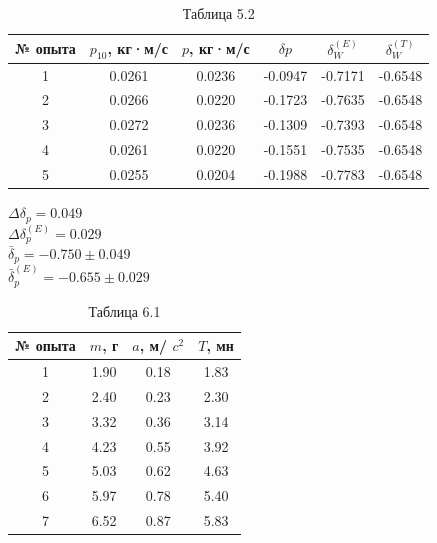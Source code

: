 \documentclass[12pt]{article}
\begin{document}
\begin{flushleft}
    
    \begin{table}[h]
        \centering
        \renewcommand{\arraystretch}{1.3}
        \setlength{\tabcolsep}{8pt}
        \captionsetup{justification=centering, font=bf}
        \caption{Таблица 5.2}
        \begin{tabular}{|c|c|c|c|c|c|}
            \hline
            № опыта & \( p_{10} \), кг·м/с & \( p \), кг·м/с & \( \delta p \) & \( \delta_W^{(E)} \) & \( \delta_W^{(T)} \) \\
            \hline
            1 & 0.0261 & 0.0236 & -0.0947 & -0.7171 & -0.6548 \\
            \hline
            2 & 0.0266 & 0.0220 & -0.1723 & -0.7635 & -0.6548 \\
            \hline
            3 & 0.0272 & 0.0236 & -0.1309 & -0.7393 & -0.6548 \\
            \hline
            4 & 0.0261 & 0.0220 & -0.1551 & -0.7535 & -0.6548 \\
            \hline
            5 & 0.0255 & 0.0204 & -0.1988 & -0.7783 & -0.6548 \\
            \hline
        \end{tabular}
    \end{table}
    
    $ \Delta \delta_p = 0.049 $ \\
    $ \Delta \delta_p^{(E)} = 0.029 $ \\
    $ \bar{\delta}_p = -0.750 \pm 0.049 $ \\
    $ \bar{\delta}_p^{(E)} = -0.655 \pm 0.029 $ \\


    \newpage    


    \begin{table}[h]
        \centering
        \renewcommand{\arraystretch}{1.3}
        \setlength{\tabcolsep}{8pt}
        \captionsetup{justification=centering, font=bf}
        \caption{Таблица 6.1}
        \begin{tabular}{|c|c|c|c|}
            \hline
            № опыта & \( m \), г & \( a \), м/ $c^2$ & \( T \), мн \\
            \hline
            1 & 1.90 & 0.18 & 1.83 \\
            \hline
            2 & 2.40 & 0.23 & 2.30 \\
            \hline
            3 & 3.32 & 0.36 & 3.14 \\
            \hline
            4 & 4.23 & 0.55 & 3.92 \\
            \hline
            5 & 5.03 & 0.62 & 4.63 \\
            \hline
            6 & 5.97 & 0.78 & 5.40 \\
            \hline
            7 & 6.52 & 0.87 & 5.83 \\
            \hline
        \end{tabular}
    \end{table}


\end{flushleft}
\end{document}
